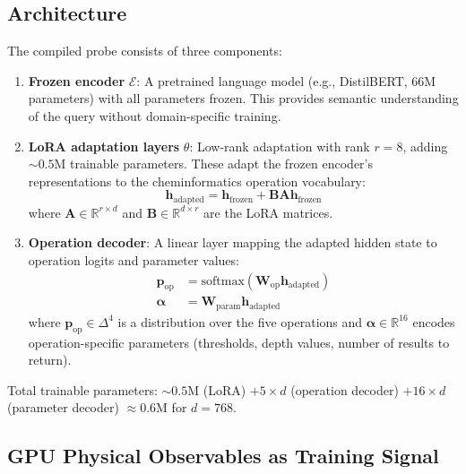 \documentclass[11pt,twocolumn,a4paper]{article}
\theoremstyle{definition}
\theoremstyle{remark}
\newcommand{\Real}{\mathbb{R}}
\begin{document}
\subsection{Architecture}

The compiled probe consists of three components:

\begin{enumerate}[nosep]
\item \textbf{Frozen encoder} $\mathcal{E}$: A pretrained language model (e.g., DistilBERT, 66M parameters) with all parameters frozen. This provides semantic understanding of the query without domain-specific training.

\item \textbf{LoRA adaptation layers} $\theta$: Low-rank adaptation \citep{hu2022} with rank $r = 8$, adding $\sim 0.5$M trainable parameters. These adapt the frozen encoder's representations to the cheminformatics operation vocabulary:
\begin{equation}
\mathbf{h}_{\mathrm{adapted}} = \mathbf{h}_{\mathrm{frozen}} + \mathbf{B}\mathbf{A}\mathbf{h}_{\mathrm{frozen}}
\label{eq:lora}
\end{equation}
where $\mathbf{A} \in \Real^{r \times d}$ and $\mathbf{B} \in \Real^{d \times r}$ are the LoRA matrices.

\item \textbf{Operation decoder}: A linear layer mapping the adapted hidden state to operation logits and parameter values:
\begin{align}
\mathbf{p}_{\mathrm{op}} &= \mathrm{softmax}(\mathbf{W}_{\mathrm{op}} \mathbf{h}_{\mathrm{adapted}}) \label{eq:op_logits} \\
\boldsymbol{\alpha} &= \mathbf{W}_{\mathrm{param}} \mathbf{h}_{\mathrm{adapted}} \label{eq:param_decode}
\end{align}
where $\mathbf{p}_{\mathrm{op}} \in \Delta^4$ is a distribution over the five operations and $\boldsymbol{\alpha} \in \Real^{16}$ encodes operation-specific parameters (thresholds, depth values, number of results to return).
\end{enumerate}

Total trainable parameters: $\sim 0.5$M (LoRA) $+ 5 \times d$ (operation decoder) $+ 16 \times d$ (parameter decoder) $\approx 0.6$M for $d = 768$.

\subsection{GPU Physical Observables as Training Signal}
\end{document}
